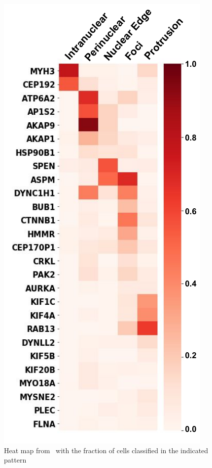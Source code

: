 \begin{figure}
	\begin{center}
	\includegraphics[width=\linewidth]{figures/chapter5/heatmap_racha}
    \caption{Heat map from~\cite{CHOUAIB_2020} with the fraction of cells classified in the indicated pattern}
	\label{fig:heatmap_racha_2}
	\end{center}
\end{figure}


